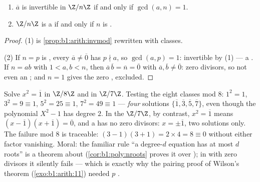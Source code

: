 \begin{theorem}\label{thm:b1:structures:zp}
\begin{enumerate}
  \item $\overline a$ is invertible in $\Z/n\Z$ if and only if
        $\gcd(a, n) = 1$.
  \item $\Z/n\Z$ is a  if and only if $n$ is .
\end{enumerate}
\end{theorem}

\begin{proof}
(1) is \cref{prop:b1:arith:invmod} rewritten with classes.

(2) If $n = p$ is , every $\overline a \neq \overline 0$ has $p
\nmid a$, so $\gcd(a, p) = 1$: invertible by (1) --- a . If $n =
ab$ with $1 < a, b < n$, then $\overline a\, \overline b = \overline
n = \overline 0$ with $\overline a, \overline b \neq \overline 0$:
zero divisors, so not even an ; and $n = 1$ gives the
zero , excluded.
\end{proof}

\begin{example}\label{ex:b1:structures:sqrtone}
Solve $x^2 = \overline 1$ in $\Z/8\Z$ and in $\Z/7\Z$. Testing the
eight classes mod $8$: $1^2 = 1$, $3^2 = 9 \equiv 1$, $5^2 = 25
\equiv 1$, $7^2 = 49 \equiv 1$ --- \emph{four} solutions
$\{\overline1, \overline3, \overline5, \overline7\}$, even though
the polynomial $X^2 - 1$ has degree $2$. In the  $\Z/7\Z$,
by contrast, $x^2 = \overline1$ means $(x - \overline1)(x +
\overline1) = \overline0$, and a  has no zero divisors: $x =
\pm\overline1$, two solutions only. The failure mod $8$ is
traceable: $(3-1)(3+1) = 2 \times 4 = 8 \equiv 0$ without either
factor vanishing. Moral: the familiar rule ``a degree-$d$
equation has at most $d$ roots'' is a theorem about
\emph{} (\cref{cor:b1:poly:nroots} proves it over
); in  with zero divisors it silently fails --- which
is exactly why the pairing proof of Wilson's theorem
(\cref{exo:b1:arith:11}) needed $p$ .
\end{example}

